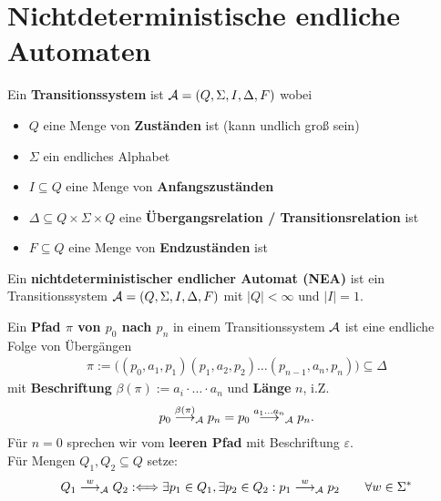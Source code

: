 \section{Nichtdeterministische endliche Automaten}

\begin{definition}\label{def1.1}
	Ein \textbf{Transitionssystem} ist $\mathcal{A}=(Q,\Sigma,I,\Delta,F)$ wobei
	\begin{itemize}
		\item $Q$ eine Menge von \textbf{Zuständen} ist (kann undlich groß sein)
		\item $\Sigma$ ein endliches Alphabet
		\item $I\subseteq Q$ eine Menge von \textbf{Anfangszuständen}
		\item $\Delta\subseteq Q\times \Sigma\times Q$ eine \textbf{Übergangsrelation / Transitionsrelation} ist
		\item $F\subseteq Q$ eine Menge von \textbf{Endzuständen} ist
	\end{itemize}
\end{definition}

\begin{definition}\label{def1.2}
	Ein \textbf{nichtdeterministischer endlicher Automat (NEA)} ist ein Transitionssystem $\mathcal{A}=(Q,\Sigma,I,\Delta,F)$ mit $|Q|<\infty$ und $|I|=1$.
\end{definition}

\begin{definition}\label{def1.4}
	Ein \textbf{Pfad $\pi$ von $p_0$ nach $p_n$} in einem Transitionssystem $\mathcal{A}$ ist eine endliche Folge von Übergängen
	\begin{align*}
		\pi:=\Big((p_0,a_1,p_1)(p_1,a_2,p_2)\ldots(p_{n-1},a_n,p_n)\Big)\subseteq\Delta
	\end{align*}
	mit \textbf{Beschriftung} $\beta(\pi):=a_i\cdot\ldots\cdot a_n$ und \textbf{Länge} $n$, i.Z.
	\begin{align*}
		p_0\overset{\beta(\pi)}{\longrightarrow}_{\mathcal{A}} p_n=p_0\overset{a_1\ldots a_n}{\longrightarrow}_{\mathcal{A}} p_n.
	\end{align*}
	Für $n=0$ sprechen wir vom \textbf{leeren Pfad} mit Beschriftung $\varepsilon$.\\
	Für Mengen $Q_1,Q_2\subseteq Q$ setze:
	\begin{align*}
		Q_1\overset{w}{\longrightarrow}_{\mathcal{A}} Q_2:\Longleftrightarrow\exists p_1\in Q_1,\exists p_2\in Q_2:p_1\overset{w}{\longrightarrow}_{\mathcal{A}} p_2\qquad\forall w\in\Sigma^\ast
	\end{align*}
\end{definition}

